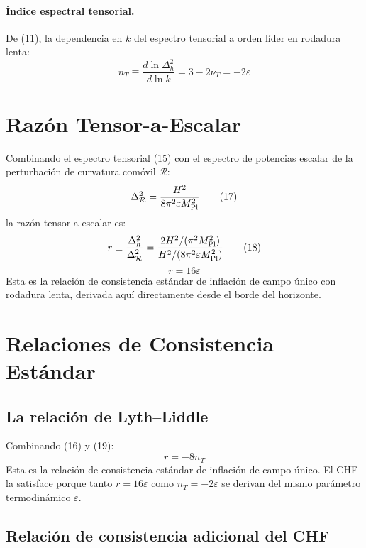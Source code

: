 \documentclass[12pt,a4paper]{article}
\begin{document}
\paragraph{Índice espectral tensorial.}
De (11), la dependencia en $k$ del espectro tensorial a orden líder en rodadura lenta:
\begin{equation}
n_T \equiv \frac{d\ln\Delta_h^2}{d\ln k} = 3 - 2\nu_T = -2\varepsilon \tag{16}
\end{equation}

\section{Razón Tensor-a-Escalar}

Combinando el espectro tensorial (15) con el espectro de potencias escalar de la perturbación de curvatura comóvil $\mathcal{R}$:
\begin{equation}
\Delta_\mathcal{R}^2 = \frac{H^2}{8\pi^2\varepsilon M_{\rm Pl}^2} \tag{17}
\end{equation}
la razón tensor-a-escalar es:
\begin{equation}
r \equiv \frac{\Delta_h^2}{\Delta_\mathcal{R}^2} = \frac{2H^2/(\pi^2 M_{\rm Pl}^2)}{H^2/(8\pi^2\varepsilon M_{\rm Pl}^2)} \tag{18}
\end{equation}
\begin{equation}
\boxed{r = 16\varepsilon} \tag{19}
\end{equation}
Esta es la relación de consistencia estándar de inflación de campo único con rodadura lenta, derivada aquí directamente desde el borde del horizonte.

\section{Relaciones de Consistencia Estándar}

\subsection{La relación de Lyth--Liddle}

Combinando (16) y (19):
\begin{equation}
r = -8n_T \tag{20}
\end{equation}
Esta es la relación de consistencia estándar de inflación de campo único. El CHF la satisface porque tanto $r = 16\varepsilon$ como $n_T = -2\varepsilon$ se derivan del mismo parámetro termodinámico $\varepsilon$.

\subsection{Relación de consistencia adicional del CHF}
\end{document}
